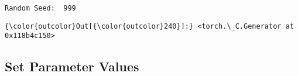 \documentclass[11pt]{article}
\begin{document}
    \begin{Verbatim}[commandchars=\\\{\},fontsize=\footnotesize]
Random Seed:  999

    \end{Verbatim}

\begin{Verbatim}[commandchars=\\\{\}]
{\color{outcolor}Out[{\color{outcolor}240}]:} <torch.\_C.Generator at 0x118b4c150>
\end{Verbatim}
            
    \subsection*{Set Parameter Values}\label{set-parameter-values}
\end{document}
